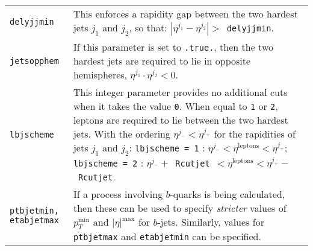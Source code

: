 \begin{longtable}{p{1.5cm}p{12cm}}
		{\tt delyjjmin} & This enforces a rapidity
		gap between the two hardest jets $j_1$ and $j_2$, so that:
		$|\eta^{j_1} - \eta^{j_2}| >$~{\tt delyjjmin}. \\
		
		{\tt jetsopphem} & If this parameter is set to {\tt .true.},
		then the two hardest jets are required to lie in opposite hemispheres,
		$\eta^{j_1} \cdot \eta^{j_2} < 0$. \\
		
		{\tt lbjscheme} & This integer parameter provides no
		additional cuts when it takes the value {\tt 0}. When equal to
		{\tt 1} or {\tt 2}, leptons are required to lie between the two
		hardest jets. With the ordering $\eta^{j_-} < \eta^{j_+}$ for the
		rapidities of jets $j_1$ and $j_2$:
		{\tt lbjscheme = 1} : 
		$\eta^{j_-} < \eta^{\mathrm{leptons}} < \eta^{j_+}$;
		{\tt lbjscheme = 2} :
		$\eta^{j_-}+$~{\tt Rcutjet}~$< \eta^{\mathrm{leptons}} < \eta^{j_+}-$~{\tt Rcutjet}. \\
		
		{\tt ptbjetmin, etabjetmax} & If a process involving $b$-quarks is being calculated, then these can
		be used to specify {\em stricter} values of $p_T^{\mathrm{min}}$
		and $|\eta|^{\mathrm{max}}$ for $b$-jets. Similarly, values for \texttt{ptbjetmax} and \texttt{etabjetmin} can be 
		specified. \\
		\hline
	\end{longtable}
